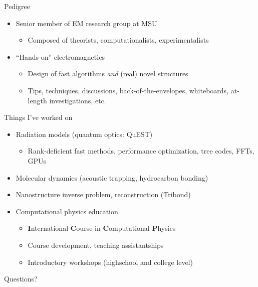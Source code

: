 \documentclass[aspectratio=169, usenames, dvipsnames]{beamer}
\begin{document}
\begin{frame}{Pedigree}
  \begin{itemize}
    \item Senior member of EM research group at MSU
      \begin{itemize}
        \item Composed of theorists, computationalists, experimentalists
      \end{itemize}
    \item ``Hands-on'' electromagnetics
      \begin{itemize}
        \item Design of fast algorithms \emph{and} (real) novel structures
        \item Tips, techniques, discussions, back-of-the-envelopes, whiteboards, at-length investigations, etc.
      \end{itemize}
  \end{itemize}
\end{frame}

\begin{frame}{Things I've worked on}
  \begin{itemize}
    \item Radiation models (quantum optics: QuEST)
      \begin{itemize}
        \item Rank-deficient fast methods, performance optimization, tree codes, FFTs, GPUs
      \end{itemize}
    \item Molecular dynamics (acoustic trapping, hydrocarbon bonding)
    \item Nanostructure inverse problem, reconstruction (Tribond)
    \item Computational physics education
      \begin{itemize}
        \item \textbf{I}nternational \textbf{C}ourse in \textbf{C}omputational \textbf{P}hysics
        \item Course development, teaching assistantships
        \item Introductory workshops (highschool and college level)
      \end{itemize}
  \end{itemize}
\end{frame}
\appendix

\begin{frame}[standout]
  Questions?
\end{frame}
\end{document}
